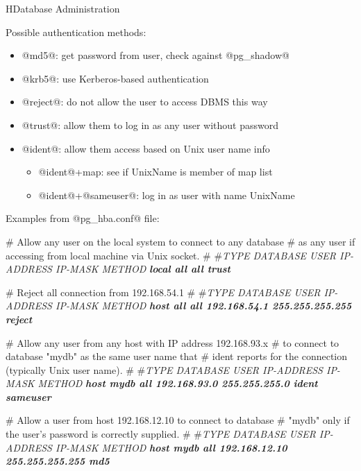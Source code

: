 \begin{lecture}{H}{Database Administration}
\begin{slide}
Possible authentication methods:
\begin{itemize}
\item @md5@: get password from user, check against @pg_shadow@
\item @krb5@: use Kerberos-based authentication
\item @reject@: do not allow the user to access DBMS this way
\item @trust@: allow them to log in as any user without password
\item @ident@: allow them access based on Unix user name info
\begin{itemize}
\item @ident@+map: see if UnixName is member of map list
\item @ident@+@sameuser@: log in as user with name UnixName
\end{itemize}
\end{itemize}
\end{slide}

\begin{slide}
Examples from @pg_hba.conf@ file:
\begin{indent}
\begin{small}
\begin{session}
    # Allow any user on the local system to connect to any database
    # as any user if accessing from local machine via Unix socket.
    #
    #{\em{TYPE  DATABASE USER IP-ADDRESS    IP-MASK          METHOD}}
    {\bf{{\em{local  all      all                                 trust}}}}
    
    # Reject all connection from 192.168.54.1
    # 
    #{\em{TYPE  DATABASE  USER IP-ADDRESS    IP-MASK          METHOD}}
    {\bf{{\em{host   all       all  192.168.54.1  255.255.255.255  reject}}}}
    
    # Allow any user from any host with IP address 192.168.93.x
    # to connect to database "mydb" as the same user name that
    # ident reports for the connection (typically Unix user name).
    # 
    #{\em{TYPE  DATABASE USER IP-ADDRESS    IP-MASK        METHOD}}
    {\bf{{\em{host   mydb     all  192.168.93.0  255.255.255.0  ident sameuser}}}}
    
    # Allow a user from host 192.168.12.10 to connect to database
    # "mydb" only if the user's password is correctly supplied.
    # 
    #{\em{TYPE  DATABASE USER IP-ADDRESS    IP-MASK          METHOD}}
    {\bf{{\em{host   mydb     all  192.168.12.10 255.255.255.255  md5}}}}
\end{session}
\end{small}
\end{indent}
\end{slide}


\end{lecture}
